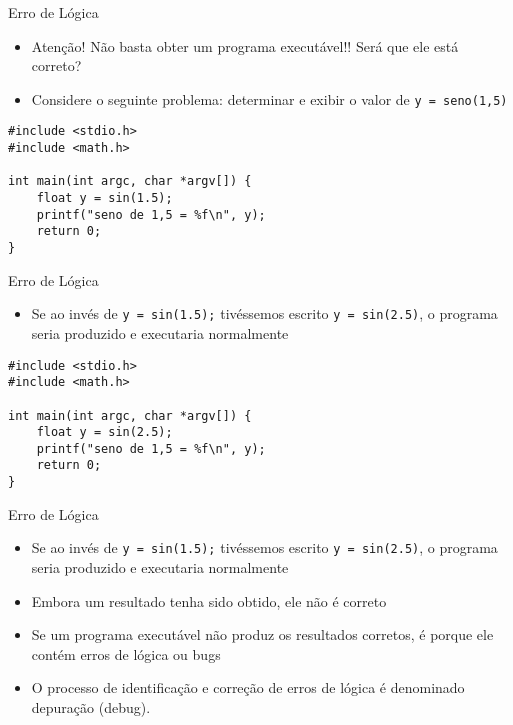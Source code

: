 \documentclass[t, aspectratio=169]{beamer}
\begin{document}
\begin{frame}[label={sec:org936c1c8},fragile]{Erro de Lógica}
 \begin{itemize}
\item \alert{Atenção!} Não basta obter um programa executável!! Será que ele está correto?
\item Considere o seguinte problema: determinar e exibir o valor de \texttt{y = seno(1,5)}
\end{itemize}
\begin{verbatim}
#include <stdio.h>
#include <math.h>

int main(int argc, char *argv[]) {
    float y = sin(1.5);
    printf("seno de 1,5 = %f\n", y);
    return 0;
}
\end{verbatim}
\end{frame}

\begin{frame}[label={sec:orgae5c99f},fragile]{Erro de Lógica}
 \begin{itemize}
\item Se ao invés de \texttt{y = sin(1.5);} tivéssemos escrito \texttt{y = sin(2.5)}, o programa seria produzido e executaria normalmente
\end{itemize}
\begin{verbatim}
#include <stdio.h>
#include <math.h>

int main(int argc, char *argv[]) {
    float y = sin(2.5);
    printf("seno de 1,5 = %f\n", y);
    return 0;
}
\end{verbatim}
\end{frame}

\begin{frame}[label={sec:org7abfdd5},fragile]{Erro de Lógica}
 \begin{itemize}
\item Se ao invés de \texttt{y = sin(1.5);} tivéssemos escrito \texttt{y = sin(2.5)}, o programa seria produzido e executaria normalmente
\item Embora um resultado tenha sido obtido, ele \alert{não é correto}
\item Se um programa executável não produz os resultados corretos, é porque ele contém \alert{erros de lógica} ou \alert{bugs}
\item O processo de identificação e correção de erros de lógica é denominado \alert{depuração} (\alert{debug}).
\end{itemize}
\end{frame}
\end{document}
